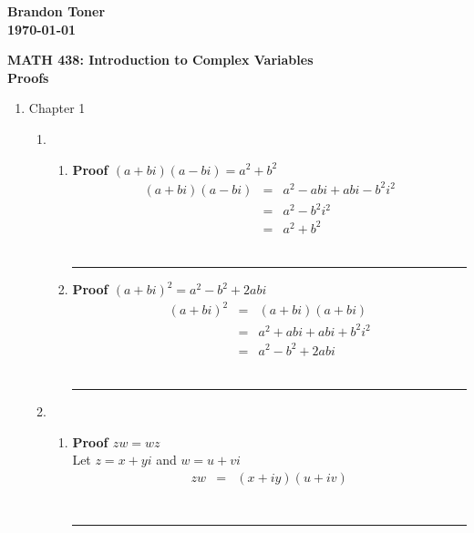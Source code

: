 \documentclass{article}%
\newenvironment{proof}[1][]{\textbf{Proof #1} }{\ \rule{0.5em}{0.5em}}
\begin{document}
\begin{flushright}
\textbf{Brandon Toner \\
\today}
\end{flushright}

\begin{center}
\textbf{MATH 438: Introduction to Complex Variables \\
Proofs} \\
\end{center}

\begin{enumerate}
    \item Chapter 1
    \begin{enumerate}[label*=\arabic*.]
        \item 
        \begin{enumerate}[label=\alph*]
            \item 
            \begin{proof}[$(a+bi)(a-bi)=a^2 + b^2$]
                \begin{eqnarray*}
                    (a+bi)(a-bi)&=& a^2 - abi + abi - b^2i^2 \\
                                &=& a^2 - b^2 i^2            \\
                                &=& a^2 + b^2
                \end{eqnarray*}
            \end{proof}
            \item
            \begin{proof}[$(a+bi)^2=a^2 - b^2 + 2abi$]
                \begin{eqnarray*}
                    (a+bi)^2 &=& (a+bi)(a+bi)              \\
                             &=& a^2 + abi + abi + b^2 i^2 \\
                             &=& a^2 - b^2 + 2abi
                \end{eqnarray*}
            \end{proof}
        \end{enumerate}
        \item
    	\begin{enumerate}[label=\alph*]
            \item
            \begin{proof}[$zw=wz$]
                \\ Let $z=x+yi$ and $w=u+vi$
                \begin{eqnarray*}
                    zw&=&(x+iy)(u+iv) \\

\end{eqnarray*}
\end{proof}
\end{enumerate}
\end{enumerate}
\end{enumerate}
\end{document}
